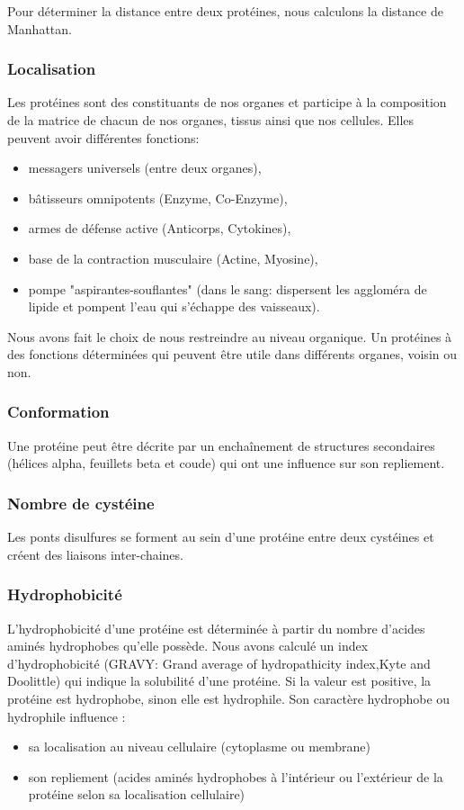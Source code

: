 Pour déterminer la distance entre deux protéines, nous calculons la distance de Manhattan.



\subsubsection*{Localisation}
Les protéines sont des constituants de nos organes et participe à la composition de la matrice de chacun de nos organes, tissus ainsi que nos cellules. Elles peuvent avoir différentes fonctions:
\begin{itemize}
\item messagers universels (entre deux organes),
\item bâtisseurs omnipotents (Enzyme, Co-Enzyme),
\item armes de défense active (Anticorps, Cytokines),
\item base de la contraction musculaire (Actine, Myosine),  
\item pompe "aspirantes-souflantes" (dans le sang: dispersent les aggloméra de lipide et pompent l'eau qui s'échappe des vaisseaux). \\
\end{itemize}

Nous avons fait le choix de nous restreindre au niveau organique. Un protéines à des fonctions déterminées qui peuvent être utile dans différents organes, voisin ou non. \\


\subsubsection*{Conformation}
Une protéine peut être décrite par un enchaînement de structures secondaires (hélices alpha, feuillets beta et coude) qui ont une influence sur son repliement. 

\subsubsection*{Nombre de cystéine}
Les ponts disulfures se forment au sein d'une protéine entre deux cystéines et créent des liaisons inter-chaines. 


\subsubsection*{Hydrophobicité}
L'hydrophobicité d'une protéine est déterminée à partir du nombre d'acides aminés hydrophobes qu'elle possède.
Nous avons calculé un index d'hydrophobicité (GRAVY: Grand average of hydropathicity index,Kyte and Doolittle) qui indique la solubilité d'une protéine. Si la valeur est positive, la protéine est hydrophobe, sinon elle est hydrophile.
Son caractère hydrophobe ou hydrophile influence :
\begin{itemize}
\item sa localisation au niveau cellulaire (cytoplasme ou membrane)
\item son repliement (acides aminés hydrophobes à l'intérieur ou l'extérieur de la protéine selon sa localisation cellulaire) 
\end{itemize}

